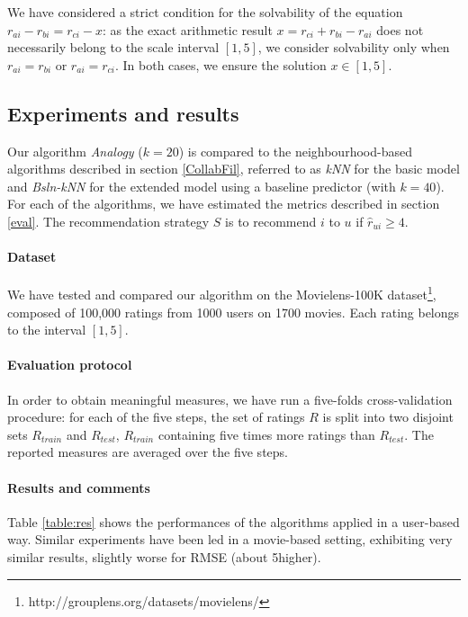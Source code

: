 We have considered a strict condition for the solvability of the equation
$r_{ai} - r_{bi} = r_{ci} - x$: as the exact arithmetic result $x=r_{ci} +
r_{bi} -r_{ai}$ does not necessarily belong to the scale interval $[1,5]$, we
consider solvability only when $r_{ai}=r_{bi}$ or $r_{ai}=r_{ci}$. In both
cases, we ensure the solution $x \in [1,5]$.

\subsection{Experiments and results}
\label{results}

Our algorithm \textit{Analogy} ($k=20$) is compared to the neighbourhood-based algorithms
described in section \ref{CollabFil}, referred to as \textit{kNN} for the basic
model and \textit{Bsln-kNN} for the extended model using a baseline predictor
(with $k=40$). For each of the algorithms, we have estimated the metrics described
in section \ref{eval}. The recommendation strategy $S$ is to recommend $i$ to
$u$ if $\hat{r}_{ui} \geq 4$.

\paragraph{Dataset\\}
We have tested and compared our algorithm on the Movielens-100K
dataset\footnote{http://grouplens.org/datasets/movielens/}, composed of 100,000
ratings from 1000 users on 1700 movies. Each rating belongs to the interval
$[1, 5]$.

\paragraph{Evaluation protocol\\}
In order to obtain meaningful measures, we have run a five-folds
cross-validation procedure: for each of the five steps, the set of ratings $R$ is
split into two disjoint sets $R_{train}$ and $R_{test}$, $R_{train}$ containing
five times more ratings than $R_{test}$. The reported measures are averaged
over the five steps.

\paragraph{Results and comments\\}

Table \ref{table:res} shows the performances of the algorithms applied in a
user-based way. Similar experiments have been led in a movie-based setting, exhibiting
very similar results, slightly worse for RMSE (about 5\permil higher).


